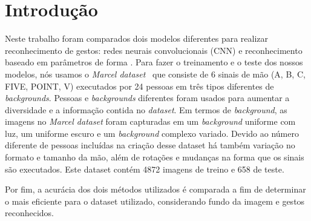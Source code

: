 \documentclass[conference]{IEEEtran}
\begin{document}
\section{Introdução} 
Neste trabalho foram comparados dois modelos diferentes para realizar reconhecimento de gestos: redes neurais convolucionais (CNN) e reconhecimento baseado em parâmetros de forma \cite{shapeparameters}.
Para fazer o treinamento e o teste dos nossos modelos, nós usamos o \textit{Marcel dataset}~\cite{dataset} que consiste de 6 sinais de mão (A, B, C, FIVE, POINT, V) executados por 24 pessoas em três tipos diferentes de \textit{backgrounds}. Pessoas e \textit{backgrounds} diferentes foram usados para aumentar a diversidade e a informação contida no \textit{dataset}. Em termos de \textit{background}, as imagens no \textit{Marcel dataset} foram capturadas em um \textit{background} uniforme com luz, um uniforme escuro e um \textit{background} complexo variado. Devido ao número diferente de pessoas incluídas na criação desse dataset há também variação no formato e tamanho da mão, além de rotações e mudanças na forma que os sinais são executados. Este dataset contém 4872 imagens de treino e 658 de teste.

\par Por fim, a acurácia dos dois métodos utilizados é comparada a fim de determinar o mais eficiente para o dataset utilizado, considerando fundo da imagem e gestos reconhecidos. 
\end{document}
